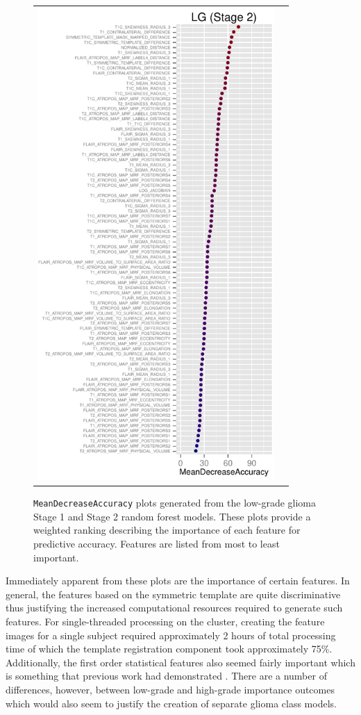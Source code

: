 \documentclass[final,5p,times,twocolumn]{elsarticle}
\begin{document}
\begin{figure}
{\begin{tabular}{cc}
  \includegraphics[width=90mm]{Figures/BRATS_LG_MAP_MRF.pdf} \\
  \end{tabular}
  }
  \caption{{\tt MeanDecreaseAccuracy} plots generated from the low-grade glioma
  Stage 1 and Stage 2 random forest models.  These plots provide a weighted 
  ranking describing the importance of each feature for predictive accuracy.
  Features are listed from most to least important.
  }
  \label{fig:lgimportance}
\end{figure}

Immediately apparent from these plots are the importance of certain features.
In general, the features based on the symmetric template are quite
discriminative thus justifying the increased computational 
resources required to generate such features.  For single-threaded processing
on the cluster, creating the feature images for a single subject required 
approximately 2 hours of total processing time of which the template registration 
component took approximately 75\%.  Additionally, the first order 
statistical features also seemed fairly important which is something that
previous work had demonstrated \citep[e.g.,][]{bauer2012,zikic2012}.
There are a number of differences, however, between low-grade and high-grade 
importance outcomes which would also seem to justify the creation of separate
glioma class models.
\end{document}
